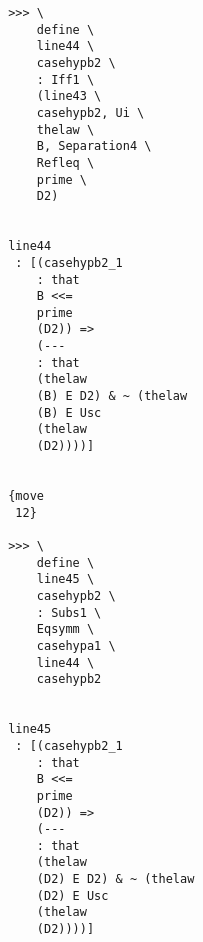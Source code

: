 \documentclass[12pt]{article}
\begin{document}
\begin{verbatim}
                                       >>> \
                                           define \
                                           line44 \
                                           casehypb2 \
                                           : Iff1 \
                                           (line43 \
                                           casehypb2, Ui \
                                           thelaw \
                                           B, Separation4 \
                                           Refleq \
                                           prime \
                                           D2)


                                       line44 
                                        : [(casehypb2_1 
                                           : that 
                                           B <<= 
                                           prime 
                                           (D2)) => 
                                           (--- 
                                           : that 
                                           (thelaw 
                                           (B) E D2) & ~ (thelaw 
                                           (B) E Usc 
                                           (thelaw 
                                           (D2))))]


                                       {move 
                                        12}

                                       >>> \
                                           define \
                                           line45 \
                                           casehypb2 \
                                           : Subs1 \
                                           Eqsymm \
                                           casehypa1 \
                                           line44 \
                                           casehypb2


                                       line45 
                                        : [(casehypb2_1 
                                           : that 
                                           B <<= 
                                           prime 
                                           (D2)) => 
                                           (--- 
                                           : that 
                                           (thelaw 
                                           (D2) E D2) & ~ (thelaw 
                                           (D2) E Usc 
                                           (thelaw 
                                           (D2))))]



\end{verbatim}
\end{document}
